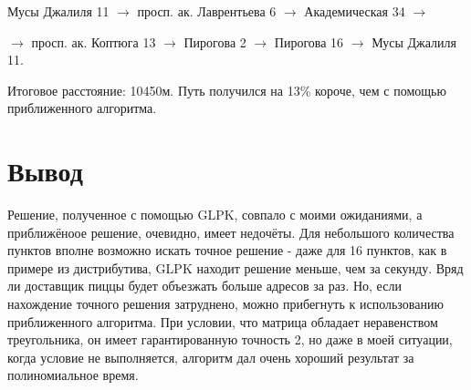 \documentclass[]{article}
\begin{document}
Мусы Джалиля 11 $\rightarrow$ просп. ак. Лаврентьева 6 $\rightarrow$ Академическая 34 $\rightarrow$

$\rightarrow$ просп. ак. Коптюга 13 $\rightarrow$ Пирогова 2 $\rightarrow$ Пирогова 16 $\rightarrow$ Мусы Джалиля 11.

Итоговое расстояние: 10450м. Путь получился на 13\% короче, чем с помощью приближенного алгоритма.

\section{Вывод}
\par\indent
Решение, полученное с помощью GLPK, совпало с моими ожиданиями, а приближёноое
решение, очевидно, имеет недочёты. Для небольшого количества пунктов вполне возможно искать
точное решение - даже для 16 пунктов, как в примере из дистрибутива, GLPK находит решение
меньше, чем за секунду. Вряд ли доставщик пиццы будет объезжать больше адресов за раз.
Но, если нахождение точного решения затруднено, можно прибегнуть к использованию
приближенного алгоритма. При условии, что матрица обладает неравенством
треугольника, он имеет гарантированную точность 2, но даже в моей ситуации, когда
условие не выполняется, алгоритм дал очень хороший результат за полиномиальное время.
\end{document}
